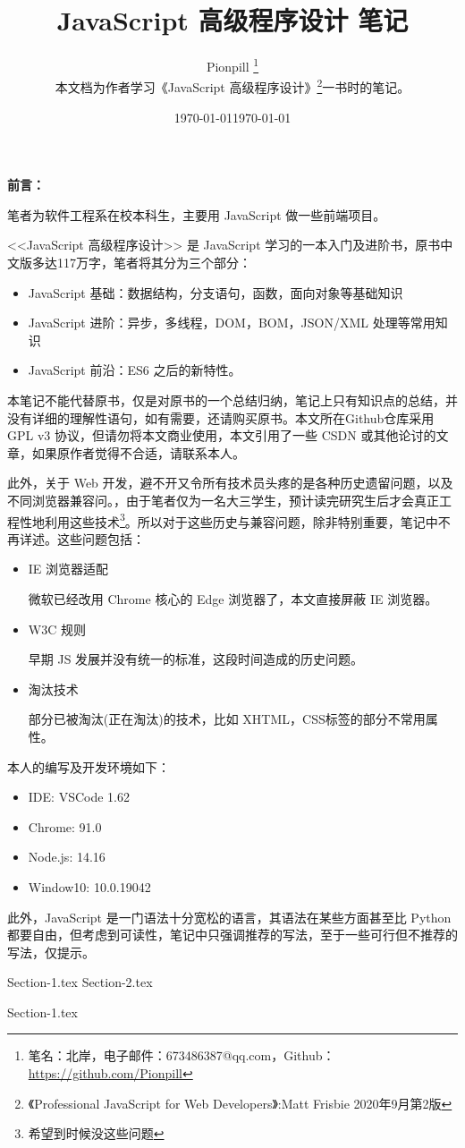 \documentclass{PionpillNote-book}
\title{JavaScript 高级程序设计 笔记}
\author{
    Pionpill \footnote{笔名：北岸，电子邮件：673486387@qq.com，Github：\url{https://github.com/Pionpill}} \\
    本文档为作者学习《JavaScript 高级程序设计》\footnote{《Professional JavaScript for Web Developers》:Matt Frisbie 2020年9月第2版}一书时的笔记。\\
}
\date{\today}
\begin{document}
\pagestyle{plain}
\maketitle

\noindent\textbf{前言：}

笔者为软件工程系在校本科生，主要用 JavaScript 做一些前端项目。

<<JavaScript 高级程序设计>> 是 JavaScript 学习的一本入门及进阶书，原书中文版多达117万字，笔者将其分为三个部分：
\begin{itemize}
    \item JavaScript 基础：数据结构，分支语句，函数，面向对象等基础知识
    \item JavaScript 进阶：异步，多线程，DOM，BOM，JSON/XML 处理等常用知识
    \item JavaScript 前沿：ES6 之后的新特性。
\end{itemize}

本笔记不能代替原书，仅是对原书的一个总结归纳，笔记上只有知识点的总结，并没有详细的理解性语句，如有需要，还请购买原书。本文所在Github仓库采用 GPL v3 协议，但请勿将本文商业使用，本文引用了一些 CSDN 或其他论讨的文章，如果原作者觉得不合适，请联系本人。

此外，关于 Web 开发，避不开又令所有技术员头疼的是各种历史遗留问题，以及不同浏览器兼容问。，由于笔者仅为一名大三学生，预计读完研究生后才会真正工程性地利用这些技术\footnote{希望到时候没这些问题}。所以对于这些历史与兼容问题，除非特别重要，笔记中不再详述。这些问题包括：
\begin{itemize}
    \item IE 浏览器适配
    
    微软已经改用 Chrome 核心的 Edge 浏览器了，本文直接屏蔽 IE 浏览器。
    \item W3C 规则
    
    早期 JS 发展并没有统一的标准，这段时间造成的历史问题。
    \item 淘汰技术
    
    部分已被淘汰(正在淘汰)的技术，比如 XHTML，CSS标签的部分不常用属性。
\end{itemize}

本人的编写及开发环境如下：
\begin{itemize}
    \item IDE: VSCode 1.62
    \item Chrome: 91.0
    \item Node.js: 14.16
    \item Window10: 10.0.19042
\end{itemize}

此外，JavaScript 是一门语法十分宽松的语言，其语法在某些方面甚至比 Python 都要自由，但考虑到可读性，笔记中只强调推荐的写法，至于一些可行但不推荐的写法，仅提示。

\date{\today}
\tableofcontents
\newpage

\setcounter{page}{1} 
\pagestyle{fancy}


{Section-1.tex}
{Section-2.tex}

{Section-1.tex}
\end{document}
